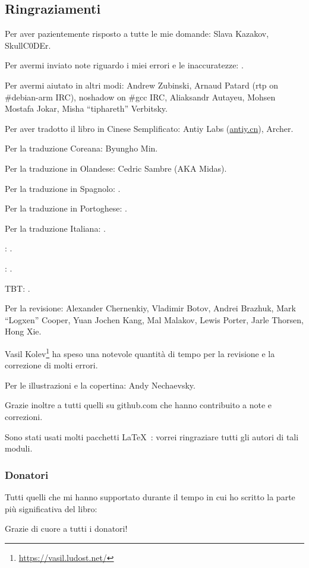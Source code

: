 \subsection*{Ringraziamenti}

Per aver pazientemente risposto a tutte le mie domande: Slava  Kazakov, SkullC0DEr.

Per avermi inviato note riguardo i miei errori e le inaccuratezze: \PeopleMistakesInaccuracies{}.

Per avermi aiutato in altri modi:
Andrew Zubinski,
Arnaud Patard (rtp on \#debian-arm IRC),
noshadow on \#gcc IRC,
Aliaksandr Autayeu,
Mohsen Mostafa Jokar,
Misha ``tiphareth'' Verbitsky.

Per aver tradotto il libro in Cinese Semplificato:
Antiy Labs (\href{http://antiy.cn}{antiy.cn}), Archer.

Per la traduzione Coreana: Byungho Min.

Per la traduzione in Olandese: Cedric Sambre (AKA Midas).

Per la traduzione in Spagnolo: \PeopleSpanishTranslators{}.

Per la traduzione in Portoghese: \PeoplePTBRTranslators{}.

Per la traduzione Italiana: \PeopleItalianTranslators{}.

\ITAph{}: \PeopleFrenchTranslators{}.

\ITAph{}: \PeopleGermanTranslators{}.

\ac{TBT}: \PeoplePolishTranslators{}.


Per la revisione:
Alexander  Chernenkiy,
Vladimir Botov,
Andrei Brazhuk,
Mark ``Logxen'' Cooper, Yuan Jochen Kang, Mal Malakov, Lewis Porter, Jarle Thorsen, Hong Xie.

Vasil Kolev\footnote{\url{https://vasil.ludost.net/}} ha speso una notevole quantità di tempo per la revisione e la correzione di molti errori.

Per le illustrazioni e la copertina: Andy Nechaevsky.

Grazie inoltre a tutti quelli su github.com che hanno contribuito a note e correzioni\FNGithubContributors{}.

Sono stati usati molti pacchetti \LaTeX\ : vorrei ringraziare tutti gli autori di tali moduli.

\subsubsection*{Donatori}

Tutti quelli che mi hanno supportato durante il tempo in cui ho scritto la parte più significativa del libro:



Grazie di cuore a tutti i donatori!

